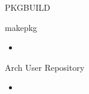 \begin{slide}{PKGBUILD}
	
\end{slide}

\begin{slide}{makepkg}
	\begin{itemize}
		\item{}
	\end{itemize}
\end{slide}

\begin{slide}{Arch User Repository}
	\begin{itemize}
		\item{}
	\end{itemize}
\end{slide}

